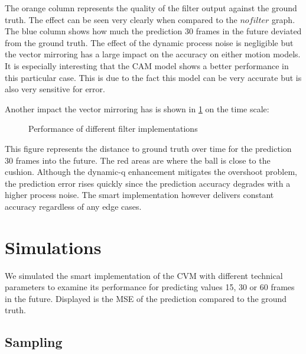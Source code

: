 \documentclass[notitlepage, a4paper, 11pt]{scrartcl}
\begin{document}
\begin{multicols}{2}
The orange column represents the quality of the filter output against the ground truth. 
The effect can be seen very clearly when compared to the $no filter$ graph. 
The blue column shows how much the prediction 30 frames in the future deviated from the ground truth.
The effect of the dynamic process noise is negligible but the vector mirroring has a large impact on the accuracy on either motion models.
It is especially interesting that the CAM model shows a better performance in this particular case. 
This is due to the fact this model can be very accurate but is also very sensitive for error.

Another impact the vector mirroring has is shown in \cref{fig:deviation-noise} on the time scale:

\begin{figure}[H]
    \centering
    \caption{Performance of different filter implementations}
    \label{fig:deviation-noise}
\end{figure}

This figure represents the distance to ground truth over time for the prediction 30 frames into the future. 
The red areas are where the ball is close to the cushion. 
Although the dynamic-q enhancement mitigates the overshoot problem, the prediction error rises quickly since the prediction accuracy degrades with a higher process noise.
The smart implementation however delivers constant accuracy regardless of any edge cases.

\section{Simulations}

We simulated the smart implementation of the CVM with different technical parameters to examine its performance for predicting values 15, 30 or 60 frames in the future.
Displayed is the MSE of the prediction compared to the ground truth.

\subsection{Sampling}


\end{multicols}
\end{document}
